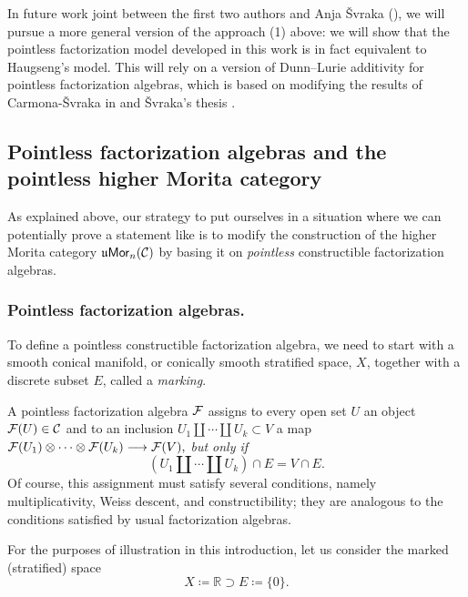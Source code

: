 \documentclass[10pt, reqno, twoside
, final
]{amsart}
\numberwithin{equation}{subsection}%
\theoremstyle{definition}
\theoremstyle{definition}
\theoremstyle{definition}
\theoremstyle{definition}
\theoremstyle{definition}
\theoremstyle{definition}
\theoremstyle{definition}
\theoremstyle{definition}
\theoremstyle{definition}
\theoremstyle{plain}
\theoremstyle{definition}
\theoremstyle{plain}
\theoremstyle{definition}
\theoremstyle{plain}
\theoremstyle{definition}
\theoremstyle{definition}
\theoremstyle{plain}
\theoremstyle{plain}
\theoremstyle{definition}
\theoremstyle{plain}
\theoremstyle{plain}
\theoremstyle{plain}
\begin{document}
In future work joint between the first two authors and Anja \v{S}vraka (\cite{ScStSv}), we will pursue a more general version of the  approach (1) above: we will show that the pointless factorization model developed in this work is in fact equivalent to Haugseng's model. This will rely on a version of Dunn--Lurie additivity for pointless factorization algebras, which is based on modifying the results of Carmona-\v{S}vraka in \cite{Carmona-Svraka} and \v{S}vraka's thesis \cite{Svraka}.


\subsection{Pointless factorization algebras and the pointless higher Morita category}

As explained above, our strategy to put ourselves in a situation where we can potentially prove a statement like  is to modify the construction of the higher Morita category $\mathfrak{u}\mathsf{Mor}_n(\mathcal{C})$ by basing it on {\em pointless} constructible factorization algebras.

\subsubsection{Pointless factorization algebras.}
To define a pointless constructible factorization algebra, we need to start with a smooth conical manifold, or conically smooth stratified space, $X$, together with a discrete subset $E$, called a {\em marking}.

A pointless factorization algebra $\mathcal{F}$ assigns to every open set $U$ an object $\mathcal{F}(U)\in \mathcal{C}$ and to an inclusion $U_1\amalg \cdots \amalg U_k \subset V$ a map
\(\mathcal{F}(U_1)  \otimes \cdots \otimes \mathcal{F}(U_k) \longrightarrow \mathcal{F}(V),\)
{\em but only if} 
\[\left(U_1\amalg \cdots \amalg U_k \right) \cap E = V\cap E .\]
Of course, this assignment must satisfy several conditions, namely multiplicativity, Weiss descent, and constructibility; they are analogous to the conditions satisfied by usual factorization algebras.

For the purposes of illustration in this introduction, let us consider the marked (stratified) space
\[ X\coloneqq\mathbb{R} \supset E\coloneqq\{0\}.\]
\end{document}
